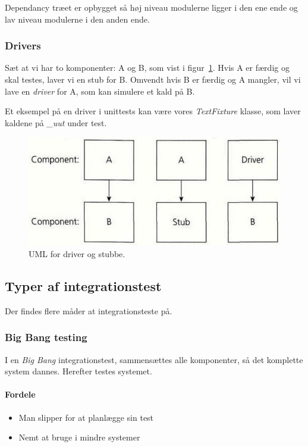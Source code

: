 Dependancy træet er opbygget så høj niveau modulerne ligger i den ene ende og lav niveau modulerne i den anden ende.

\subsubsection{Drivers}

Sæt at vi har to komponenter: A og B, som vist i figur~\ref{fig:driver}. Hvis A er færdig og skal testes, laver vi en stub for B. 
Omvendt hvis B er færdig og A mangler, vil vi lave en \textit{driver} for A, som kan simulere et kald på B.

Et eksempel på en driver i unittests kan være vores \textit{TextFixture} klasse, som laver kaldene på \textit{\_uut} under test.

\begin{figure}[H]
\centering
\includegraphics[width=0.6\linewidth]{figs/driver}
\caption{UML for driver og stubbe.}
\label{fig:driver}
\end{figure}

\subsection{Typer af integrationstest}
Der findes flere måder at integrationsteste på.


\subsubsection{Big Bang testing}
I en \textit{Big Bang} integrationstest, sammensættes alle komponenter, så det komplette system dannes. Herefter testes systemet.

\paragraph{Fordele}
\begin{itemize}
	\item Man slipper for at planlægge sin test
	\item Nemt at bruge i mindre systemer
\end{itemize}

